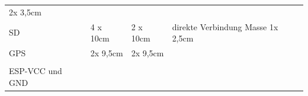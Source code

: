 \documentclass[
]{article}
\begin{document}
\begin{longtable}[]{@{}llll@{}}
\begin{minipage}[t]{0.22\columnwidth}
{2x 3,5cm}\strut
\end{minipage}\tabularnewline
\begin{minipage}[t]{0.22\columnwidth}\raggedright
{SD}\strut
\end{minipage} & \begin{minipage}[t]{0.22\columnwidth}\raggedright
{4 x 10cm}\strut
\end{minipage} & \begin{minipage}[t]{0.22\columnwidth}\raggedright
{2 x 10cm}\strut
\end{minipage} & \begin{minipage}[t]{0.22\columnwidth}\raggedright
{direkte Verbindung Masse 1x 2,5cm}\strut
\end{minipage}\tabularnewline
\begin{minipage}[t]{0.22\columnwidth}\raggedright
{GPS}\strut
\end{minipage} & \begin{minipage}[t]{0.22\columnwidth}\raggedright
{2x 9,5cm}\strut
\end{minipage} & \begin{minipage}[t]{0.22\columnwidth}\raggedright
{2x 9,5cm}\strut
\end{minipage} & \begin{minipage}[t]{0.22\columnwidth}\raggedright
{}\strut
\end{minipage}\tabularnewline
\begin{minipage}[t]{0.22\columnwidth}\raggedright
{}\strut
\end{minipage} & \begin{minipage}[t]{0.22\columnwidth}\raggedright
{}\strut
\end{minipage} & \begin{minipage}[t]{0.22\columnwidth}\raggedright
{}\strut
\end{minipage} & \begin{minipage}[t]{0.22\columnwidth}\raggedright
{}\strut
\end{minipage}\tabularnewline
\begin{minipage}[t]{0.22\columnwidth}\raggedright
{ESP-VCC und GND}\strut
\end{minipage} & \begin{minipage}[t]{0.22\columnwidth}\raggedright
{}\strut
\end{minipage} & \begin{minipage}[t]{0.22\columnwidth}\raggedright
{}\strut
\end{minipage} & \begin{minipage}[t]{0.22\columnwidth}\raggedright

\end{minipage}
\end{longtable}
\end{document}
